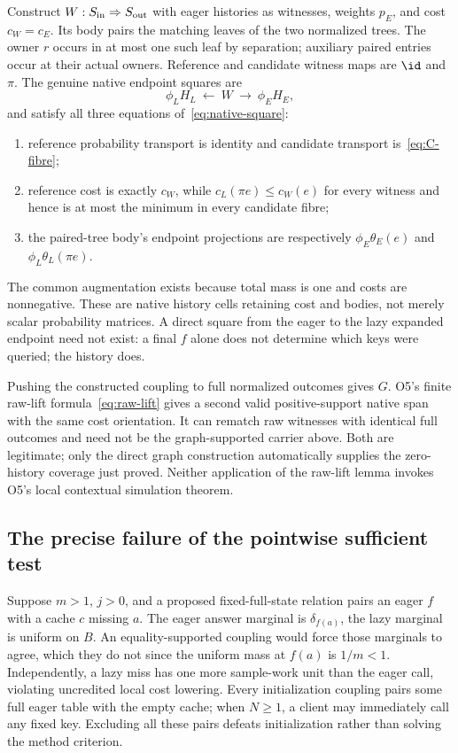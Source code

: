 Construct $W:S_{\rm in}\Rightarrow S_{\rm out}$ with eager histories
as witnesses, weights $p_E$, and cost $c_W=c_E$. Its body pairs the
matching leaves of the two normalized trees. The owner $r$ occurs in at
most one such leaf by separation; auxiliary paired entries occur at their
actual owners. Reference and candidate witness maps are $\id$ and $\pi$.
The genuine native endpoint squares are
\[
\phi_LH_L\ \longleftarrow\ W\ \longrightarrow\ \phi_EH_E,
\]
and satisfy all three equations of~\eqref{eq:native-square}:
\begin{enumerate}
\item reference probability transport is identity and candidate transport
is~\eqref{eq:C-fibre};
\item reference cost is exactly $c_W$, while
$c_L(\pi e)\leq c_W(e)$ for every witness and hence is at most the
minimum in every candidate fibre;
\item the paired-tree body's endpoint projections are respectively
$\phi_E\theta_E(e)$ and $\phi_L\theta_L(\pi e)$.
\end{enumerate}
The common augmentation exists because total mass is one and costs are
nonnegative. These are native history cells retaining cost and bodies,
not merely scalar probability matrices. A direct square from the eager
to the lazy expanded endpoint need not exist: a final $f$ alone does
not determine which keys were queried; the history does.

Pushing the constructed coupling to full normalized outcomes gives $G$.
O5's finite raw-lift formula~\eqref{eq:raw-lift} gives a second valid
positive-support native span with the same cost orientation. It can
rematch raw witnesses with identical full outcomes and need not be the
graph-supported carrier above. Both are legitimate; only the direct graph
construction automatically supplies the zero-history coverage just proved.
Neither application of the raw-lift lemma invokes O5's local contextual
simulation theorem.

\subsection{The precise failure of the pointwise sufficient test}
Suppose $m>1$, $j>0$, and a proposed fixed-full-state relation pairs an
eager $f$ with a cache $c$ missing $a$. The eager answer marginal is
$\delta_{f(a)}$, the lazy marginal is uniform on $B$. An equality-supported
coupling would force those marginals to agree, which they do not since
the uniform mass at $f(a)$ is $1/m<1$. Independently, a lazy miss has one
more sample-work unit than the eager call, violating uncredited local
cost lowering. Every initialization coupling pairs some full eager table
with the empty cache; when $N\geq1$, a client may immediately call any
fixed key. Excluding all these pairs defeats initialization rather than
solving the method criterion.

